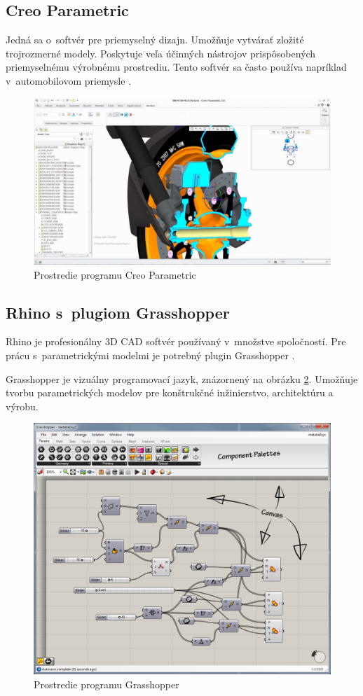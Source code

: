 \subsection*{Creo Parametric}
Jedná sa o~softvér pre priemyselný dizajn. Umožňuje vytvárať zložité trojrozmerné modely. Poskytuje veľa účinných nástrojov prispôsobených priemyselnému výrobnému prostrediu. Tento softvér sa často používa napríklad v~automobilovom priemysle \cite{gaget_2018}.\nopagebreak
\begin{figure}[H]
    \centering
    \includegraphics[width = 0.5\linewidth]{obrazky-figures/programs/Creo_Parametric.jpg}
    \caption{Prostredie programu Creo Parametric \protect\footnotemark }
    \label{fig:Creo}
\end{figure}


\subsection*{Rhino s~plugiom Grasshopper}
Rhino je profesionálny 3D CAD softvér používaný v~množstve spoločností. Pre prácu s~parametrickými modelmi je potrebný plugin Grasshopper \cite{gaget_2018}. 

Grasshopper je vizuálny programovací jazyk, znázornený na obrázku \ref{fig:Grasshopper}.
Umožňuje tvorbu parametrických modelov pre konštrukčné inžinierstvo, architektúru a výrobu.\nopagebreak
\begin{figure}[H]
    \centering
    \includegraphics[width = 0.5\linewidth]{obrazky-figures/programs/Grasshopper_MainWindow.png}
    \caption{Prostredie programu Grasshopper \protect\footnotemark 
    }
    \label{fig:Grasshopper}
\end{figure}

